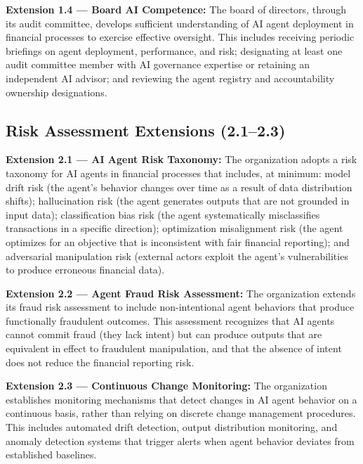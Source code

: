 \documentclass[12pt]{article}
\begin{document}
\begin{definitionbox}
\textbf{Extension 1.4 --- Board AI Competence:} The board of directors, through its audit committee, develops sufficient understanding of AI agent deployment in financial processes to exercise effective oversight. This includes receiving periodic briefings on agent deployment, performance, and risk; designating at least one audit committee member with AI governance expertise or retaining an independent AI advisor; and reviewing the agent registry and accountability ownership designations.
\end{definitionbox}

\subsection{Risk Assessment Extensions (2.1--2.3)}

\begin{definitionbox}
\textbf{Extension 2.1 --- AI Agent Risk Taxonomy:} The organization adopts a risk taxonomy for AI agents in financial processes that includes, at minimum: model drift risk (the agent's behavior changes over time as a result of data distribution shifts); hallucination risk (the agent generates outputs that are not grounded in input data); classification bias risk (the agent systematically misclassifies transactions in a specific direction); optimization misalignment risk (the agent optimizes for an objective that is inconsistent with fair financial reporting); and adversarial manipulation risk (external actors exploit the agent's vulnerabilities to produce erroneous financial data).
\end{definitionbox}

\begin{definitionbox}
\textbf{Extension 2.2 --- Agent Fraud Risk Assessment:} The organization extends its fraud risk assessment to include non-intentional agent behaviors that produce functionally fraudulent outcomes. This assessment recognizes that AI agents cannot commit fraud (they lack intent) but can produce outputs that are equivalent in effect to fraudulent manipulation, and that the absence of intent does not reduce the financial reporting risk.
\end{definitionbox}

\begin{definitionbox}
\textbf{Extension 2.3 --- Continuous Change Monitoring:} The organization establishes monitoring mechanisms that detect changes in AI agent behavior on a continuous basis, rather than relying on discrete change management procedures. This includes automated drift detection, output distribution monitoring, and anomaly detection systems that trigger alerts when agent behavior deviates from established baselines.
\end{definitionbox}
\end{document}
